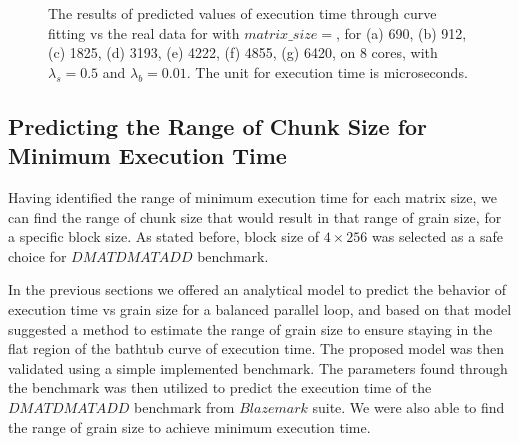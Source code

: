 \begin{figure}[H]
{	\label{fig56:g}}
	\caption{The results of predicted values of execution time through curve fitting vs the real data for with $matrix\_size=$, for (a) 690, (b) 912, (c) 1825, (d) 3193, (e) 4222, (f) 4855, (g) 6420, on 8 cores, with $\lambda_{s}=0.5$ and $\lambda_{b}=0.01$. The unit for execution time is microseconds.}
	\label{fig56}	
\end{figure}


\subsection{Predicting the Range of Chunk Size for Minimum Execution Time}
Having identified the range of minimum execution time for each matrix size, we can find the range of chunk size that would result in that range of grain size, for a specific block size.
As stated before, block size of $4\times{256}$ was selected as a safe choice for $DMATDMATADD$ benchmark. 



In the previous sections we offered an analytical model to predict the behavior of execution time vs grain size for a balanced parallel loop, and based on that model suggested a method to estimate the range of grain size to ensure staying in the flat region of the bathtub curve of execution time. The proposed model was then validated using a simple implemented benchmark. The parameters found through the benchmark was then utilized to predict the execution time of the $DMATDMATADD$ benchmark from $Blazemark$ suite. We were also able to find the range of grain size to achieve minimum execution time.   
 





\vspace{\baselineskip}
%





